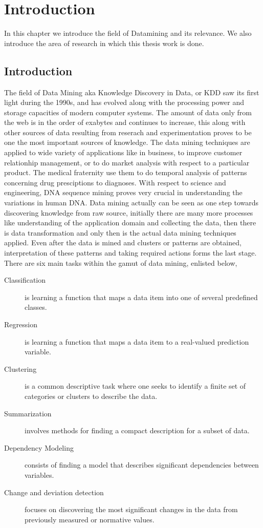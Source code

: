 \chapter{Introduction}


\textsf{%
In this chapter we introduce the field of Datamining and its relevance. We
also introduce the area of research in which this thesis work is done.}

\section{Introduction}
The field of Data Mining aka Knowledge Discovery in Data, or KDD saw its first
light during the 1990s, and has evolved along with the processing power and
storage capacities of modern computer systems. The amount of data only from the
web is in the order of exabytes and continues to increase, this along with other
sources of data resulting from reserach and experimentation proves to be one the
most important sources of knowledge. The data mining techniques are applied
to wide variety of applications like in business, to improve customer
relationhip management, or to do market analysis with respect to a particular
product. The medical fraternity use them to do temporal analysis of patterns
concerning drug presciptions to diagnoses. With respect to science and
engineering, DNA sequence mining proves very crucial in understanding the
variations in human DNA. Data mining actually can be seen as one step towards
discovering knowledge from raw source, initially there are many more processes
like understanding of the application domain and collecting the data, then there
is data transformation and only then is the actual data mining techniques
applied. Even after the data is mined and clusters or patterns are obtained,
interpretation of these patterns and taking required actions forms the last
stage. There are six main tasks within the gamut of data mining, enlisted
below, \cite{Fayyad96fromdata}
\begin{description}
  \item[Classification] is learning a function that maps a data item into one of
several predefined classes.
  \item[Regression] is learning a function that maps a data item to a
real-valued prediction variable.
  \item[Clustering] is a common descriptive task where one seeks to identify a
finite set of categories or clusters to describe the data.
  \item[Summarization] involves methods for finding a compact description for a
subset of data.
  \item[Dependency Modeling] consists of finding a model that describes
significant dependencies between variables.
\item[Change and deviation detection] focuses on discovering the most
significant changes in
the data from previously measured or normative values.
\end{description}

